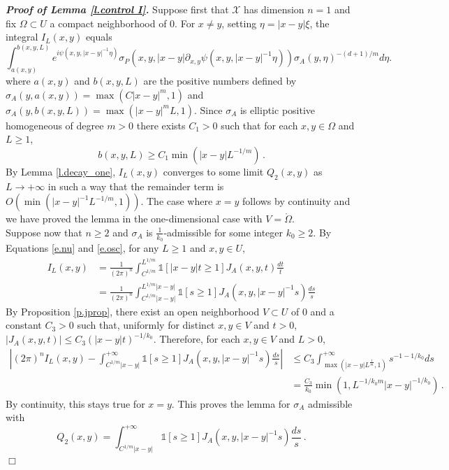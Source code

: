 \documentclass[10pt,twoside]{article}
\newcommand{\pfty}{+\infty}
\newcommand{\one}{\mathds{1}}
\newcommand{\man}{\mathcal{X}}
\newenvironment{prf}[1][]
{\vskip 2mm  {\it \bf Proof#1. }}{$\Box$ \vskip 2mm}
\numberwithin{theorem}{section}
\begin{document}
\begin{prf}[ of Lemma \ref{l.control I}]
Suppose first that $\man$ has dimension $n=1$ and fix $\Omega\subset U$ a compact neighborhood of $0$. For $x\neq y$, setting $\eta=|x-y|\xi$, the integral $I_L(x,y)$ equals
\[
\int_{a(x,y)}^{b(x,y,L)} e^{i\psi(x,y,|x-y|^{-1}\eta)}
\sigma_P\left(x,y,|x-y|\partial_{x,y}\psi\left(x,y,|x-y|^{-1}\eta\right)\right)\sigma_A(y,\eta)^{-(d+1)/m}d\eta.
\]
where $a(x,y)$ and $b(x,y,L)$ are the positive numbers defined by $\sigma_A(y,a(x,y))=\max\left(C|x-y|^m,1\right)$ and $\sigma_A(y,b(x,y,L))=\max\left(|x-y|^mL,1\right)$. Since $\sigma_A$ is elliptic positive homogeneous of degree $m>0$ there exists $C_1>0$ such that for each $x,y\in \Omega$ and $L\geq 1$,
\[
b(x,y,L)\geq C_1 \min\left(|x-y| L^{-1/m}\right)\, .
\]  
By Lemma \ref{l.decay_one}, $I_L(x,y)$ converges to some limit $Q_2(x,y)$ as $L\rightarrow\pfty$ in such a way that the remainder term is $O\left(\min\left(|x-y|^{-1}L^{-1/m},1\right)\right)$. The case where $x=y$ follows by continuity and we have proved the lemma in the one-dimensional case with $V=\mathring{\Omega}$.\\

Suppose now that $n\geq 2$ and $\sigma_A$ is $\frac{1}{k_0}$-admissible for some integer $k_0\geq 2$. By Equations \eqref{e.nu} and \eqref{e.osc}, for any $L\geq 1$ and $x,y\in U$,
\begin{align*}
  I_L(x,y)&=\frac{1}{(2\pi)^n}\int_{C^{1/m}}^{L^{1/m}}\one[|x-y|t\geq 1]J_A(x,y,t)\frac{dt}{t}\\
&=\frac{1}{(2\pi)^n}\int_{C^{1/m}|x-y|}^{L^{1/m}|x-y|}\one[s\geq 1]J_A\left(x,y,|x-y|^{-1}s\right)\frac{ds}{s}
\end{align*}
By Proposition \ref{p.jprop}, there exist an open neighborhood $V\subset U$ of $0$ and a constant $C_3>0$ such that, uniformly for distinct $x,y\in V$ and $t>0$, $|J_A(x,y,t)|\leq C_3\left(|x-y|t\right)^{-1/k_0}$. Therefore, for each $x,y\in V$ and $L>0$,
\begin{align*}
  \left|(2\pi)^nI_L(x,y)-\int_{C^{1/m}|x-y|}^{\pfty}\one[s\geq 1]J_A\left(x,y,|x-y|^{-1}s\right)\frac{ds}{s}\right|&\leq C_3\int_{\max\left(|x-y|L^{\frac{1}{m}},1\right)}^{\pfty}s^{-1-1/k_0}ds\\
  &=\frac{C_3}{k_0}\min\left(1,L^{-1/k_0m}|x-y|^{-1/k_0}\right)\, .
\end{align*}
  By continuity, this stays true for $x=y$. This proves the lemma for $\sigma_A$ admissible with  
\[
Q_2(x,y)=\int_{C^{1/m}|x-y|}^{\pfty}\one[s\geq 1]J_A\left(x,y,|x-y|^{-1}s\right)\frac{ds}{s}\, .
\]
\end{prf}
\end{document}
